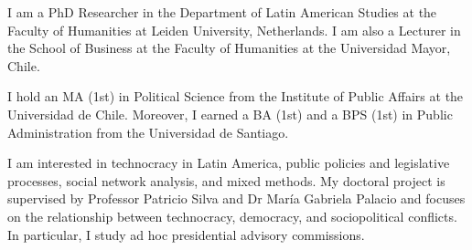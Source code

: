 




\par{I am a PhD Researcher in the Department of Latin American Studies at the Faculty of Humanities at Leiden University, Netherlands. I am also a Lecturer in the School of Business at the Faculty of Humanities at the Universidad Mayor, Chile.

I hold an MA (1st) in Political Science from the Institute of Public Affairs at the Universidad de Chile. Moreover, I earned a BA (1st) and a BPS (1st) in Public Administration from the Universidad de Santiago.

I am interested in technocracy in Latin America, public policies and legislative processes, social network analysis, and mixed methods. My doctoral project is supervised by Professor Patricio Silva and Dr María Gabriela Palacio and focuses on the relationship between technocracy, democracy, and sociopolitical conflicts. In particular, I study ad hoc presidential advisory commissions.}\\